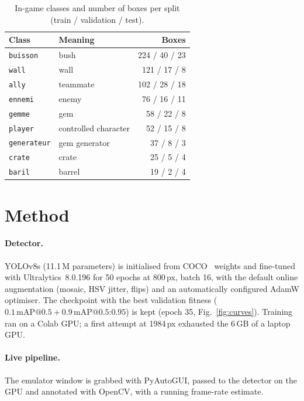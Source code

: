 \documentclass[10pt,twocolumn]{article}
\begin{document}
\begin{table}[t]
\centering\small
\begin{tabular}{llr}
\toprule
Class & Meaning & Boxes\\
\midrule
\texttt{buisson} & bush & 224 / 40 / 23\\
\texttt{wall} & wall & 121 / 17 / 8\\
\texttt{ally} & teammate & 102 / 28 / 18\\
\texttt{ennemi} & enemy & 76 / 16 / 11\\
\texttt{gemme} & gem & 58 / 22 / 8\\
\texttt{player} & controlled character & 52 / 15 / 8\\
\texttt{generateur} & gem generator & 37 / 8 / 3\\
\texttt{crate} & crate & 25 / 5 / 4\\
\texttt{baril} & barrel & 19 / 2 / 4\\
\bottomrule
\end{tabular}
\caption{In-game classes and number of boxes per split (train / validation / test).}
\label{tab:classes}
\end{table}

\section{Method}
\paragraph{Detector.} YOLOv8s (11.1\,M parameters) is initialised from COCO~\cite{lin2014coco} weights and
fine-tuned with Ultralytics~8.0.196 for 50 epochs at 800\,px, batch 16, with the default online
augmentation (mosaic, HSV jitter, flips) and an automatically configured AdamW optimiser. The checkpoint with
the best validation fitness ($0.1\,\text{mAP@0.5} + 0.9\,\text{mAP@0.5:0.95}$) is kept (epoch 35,
Fig.~\ref{fig:curves}). Training ran on a Colab GPU; a first attempt at 1984\,px exhausted the 6\,GB of a
laptop GPU.

\paragraph{Live pipeline.} The emulator window is grabbed with PyAutoGUI, passed to the detector on the GPU
and annotated with OpenCV, with a running frame-rate estimate.
\end{document}
